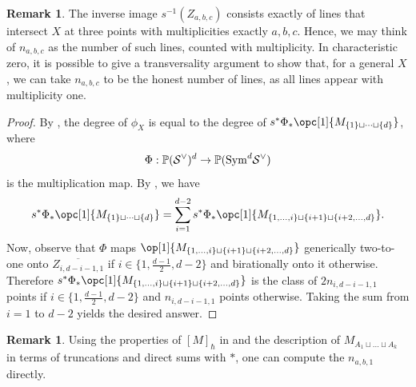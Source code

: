\documentclass[12pt]{amsart}
\newcommand{\mb}{\mathbb}
\newcommand{\mc}{\mathcal}
\newcommand{\ol}{\overline}
\theoremstyle{plain}
\theoremstyle{definition}
\newtheorem{Rem}[Thm]{Remark}
\theoremstyle{remark}
\begin{document}
\begin{Rem}
The inverse image $s^{-1}(Z_{a, b, c})$ consists exactly of lines that intersect $X$ at three points with multiplicities exactly $a,b,c$. Hence, we may think of $n_{a, b, c}$ as the number of such lines, counted with multiplicity. In characteristic zero, it is possible to give a transversality argument to show that, for a general $X$, we can take $n_{a,b,c}$ to be the honest number of lines, as all lines appear with multiplicity one. 
\end{Rem}

\begin{proof}
By , the degree of $\phi_X$ is equal to the degree of $s^{*}\Phi_*\opc[1]{M_{\{1\}\sqcup\cdots\sqcup \{d\}}}$, where
\begin{align*}
\Phi:\mb{P}(\mc{S}^{\vee})^d\to \mb{P}({\rm Sym}^d \mc{S}^{\vee})
\end{align*} is the multiplication map.
By , we have
\begin{align*}
s^{*}\Phi_*\opc[1]{M_{\{1\}\sqcup\cdots\sqcup \{d\}}} = \sum_{i=1}^{d-2} s^{*}\Phi_*\opc[1]{M_{\{1,\ldots,i\}\sqcup \{i+1\}\sqcup \{i+2, \ldots,d\}}}.
\end{align*}
Now, observe that $\Phi$ maps $\op[1]{M_{\{1,\ldots,i\}\sqcup \{i+1\}\sqcup \{i+2,\ldots,d\}}}$ generically two-to-one onto $\ol{Z_{i,d-i-1, 1}}$ if $i\in\{1,\frac{d-1}{2},d-2\}$ and birationally onto it otherwise. Therefore $ s^{*}\Phi_*\opc[1]{M_{\{1,\ldots,i\}\sqcup \{i+1\}\sqcup \{i+2, \ldots,d\}}}$ is the class of $2n_{i,d-i-1,1}$ points if $i\in\{1,\frac{d-1}{2},d-2\}$ and $n_{i,d-i-1,1}$ points otherwise. Taking the sum from $i=1$ to $d-2$ yields the desired answer.
\end{proof}
\begin{Rem}
Using the properties of $[M]_\hbar$ in  and the description of $M_{A_1 \sqcup \ldots \sqcup A_k}$ in terms of truncations and direct sums with $\ast$, one can compute the $n_{a,b,1}$ directly.
\end{Rem}

\end{document}

